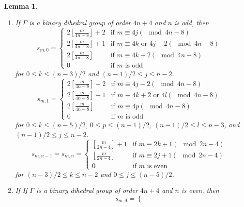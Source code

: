 \documentclass{amsart}[12pt]
\newtheorem{lemma}[theorem]{Lemma}
\theoremstyle{definition}
\theoremstyle{remark}
\numberwithin{equation}{section}
\begin{document}
\begin{lemma}
\begin{enumerate}
For $4 \leq q \leq n - 2$ and $q$ even,
\[
s_{m, q} = 
\begin{cases} 
2 [\frac{m}{2n - 4}] + 2 & \textrm{if $m \equiv 2j + 1 (\mod 2n - 4)$ } \\
2 [\frac{m}{2n - 4}] + 1 & \textrm{if $m \equiv 2l + 1 (\mod 2n - 4)$ } \\
2 [\frac{m}{2n - 4}] & \textrm{if $m \equiv 2k + 1 (\mod 2n - 4)$ } \\
0 & \textrm{if $m$ is even}
\end{cases}
\]
for $0 \leq k \leq (q - 4)/2$, $(q - 2)/2 \leq l \leq n - (q + 4)/2$, and $n - (q + 2)/2 \leq j \leq n - 2$.
\item If $\Gamma$ is a binary dihedral group of order $4n + 4$ and $n$ is odd, then
\[
s_{m, 0} = 
\begin{cases} 
2 [\frac{m}{4n - 8}] + 2 & \textrm{if $m \equiv 4j (\mod 4n - 8)$ } \\
2 [\frac{m}{4n - 8}] + 1 & \textrm{if $m \equiv 4k$ or $4j - 2 (\mod 4n - 8)$ } \\
2 [\frac{m}{4n - 8}] & \textrm{if $m \equiv 4k + 2 (\mod 4n - 8)$ } \\
0 & \textrm{if $m$ is odd}
\end{cases}
\]
for $0 \leq k \leq (n - 3)/2$ and $(n - 1)/2 \leq j \leq n - 2$.
\[
s_{m, 1} = 
\begin{cases} 
2 [\frac{m}{4n - 8}] + 2 & \textrm{if $m \equiv 4j - 2 (\mod 4n - 8)$ } \\
2 [\frac{m}{4n - 8}] + 1 & \textrm{if $m \equiv 4k + 2$ or $4l (\mod 4n - 8)$ } \\
2 [\frac{m}{4n - 8}] & \textrm{if $m \equiv 4p (\mod 4n - 8)$ } \\
0 & \textrm{if $m$ is odd}
\end{cases}
\]
for $0 \leq k \leq (n - 5)/2$, $0 \leq p \leq (n - 1)/2$, $(n - 1)/2 \leq l \leq n - 3$, and $(n - 1)/2 \leq j \leq n - 2$.
\[
s_{m, n - 1} = s_{m, n} =
\begin{cases} 
[\frac{m}{2n - 4}] + 1 & \textrm{if $m \equiv 2k + 1 (\mod 2n - 4)$ } \\
[\frac{m}{2n - 4}] & \textrm{if $m \equiv 2j + 1 (\mod 2n - 4)$ } \\
0 & \textrm{if $m$ is even}
\end{cases}
\]
for $(n - 3)/2 \leq k \leq n - 2$ and $0 \leq j \leq (n - 5)/2$.
\item If If $\Gamma$ is a binary dihedral group of order $4n + 4$ and $n$ is even, then
\[
s_{m, 0} = 
\begin{cases} 

\end{cases}\]
\end{enumerate}
\end{lemma}
\end{document}
